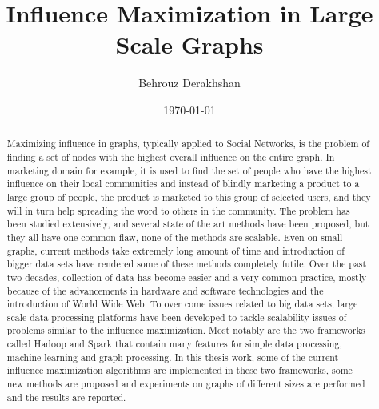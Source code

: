 \documentclass[english]{tktltiki}
\begin{document}
\onehalfspacing

\title{Influence Maximization in Large Scale Graphs}
\author{Behrouz Derakhshan}
\date{\today}

\maketitle



\begin{abstract}

Maximizing influence in graphs, typically applied to Social Networks, is the problem of finding a set of nodes with the highest overall influence on the entire graph. In marketing domain for example, it is used to find the set of people who have the highest influence on their local communities and instead of blindly marketing a product to a large group of people, the product is marketed to this group of selected users, and they will in turn help spreading the word to others in the community. The problem has been studied extensively, and several state of the art methods have been proposed, but they all have one common flaw, none of the methods are scalable. Even on small graphs, current methods take extremely long amount of time and introduction of bigger data sets have rendered some of these methods completely futile. Over the past two decades, collection of data has become easier and a very common practice, mostly because of the advancements in hardware and software technologies and the introduction of World Wide Web. To over come issues related to big data sets, large scale data processing platforms have been developed to tackle scalability issues of problems similar to the influence maximization. Most notably are the two frameworks called Hadoop and Spark that contain many features for simple data processing, machine learning and graph processing. In this thesis work, some of the current influence maximization algorithms are implemented in these two frameworks, some new methods are proposed and experiments on graphs of different sizes are performed and the results are reported. 

\end{abstract}
\end{document}
